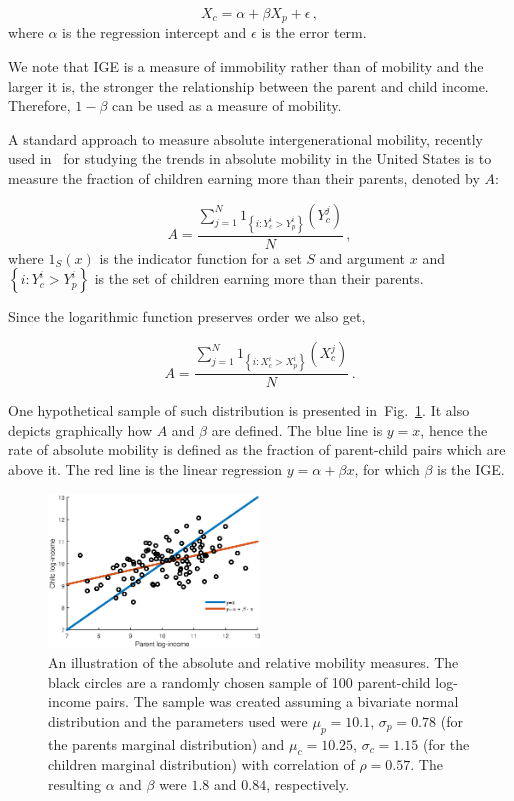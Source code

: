 \documentclass[prl,amsmath,twocolumn,nofootinbib]{revtex4}
\newcommand{\flabel}[1]{\label{fig:#1}}
\newcommand{\fref}[1]{Fig.~\ref{fig:#1}}
\newcommand{\be}{\begin{equation}}
\newcommand{\ee}{\end{equation}}
\numberwithin{equation}{section}
\begin{document}
\be
X_c = \alpha + \beta X_p + \epsilon\,,
\ee
where $\alpha$ is the regression intercept and $\epsilon$ is the error term.

We note that IGE is a measure of immobility rather than of mobility and the larger it is, the stronger the relationship between the parent and child income. Therefore, $1-\beta$  can be used as a measure of mobility.

A standard approach to measure absolute intergenerational mobility, recently used in~\cite{chetty2017fading} for studying the trends in absolute mobility in the United States is to measure the fraction of children earning more than their parents, denoted by $A$:

\be
A = \frac{\sum_{j=1}^{N}{1_{\left\{i:Y_c^i>Y_p^i\right\}}\left(Y_c^j\right)}}{N}\,,
\ee
where $1_S\left(x\right)$ is the indicator function for a set $S$ and argument $x$ and $\left\{i:Y_c^i>Y_p^i\right\}$ is the set of children earning more than their parents.

Since the logarithmic function preserves order we also get,

\be
A = \frac{\sum_{j=1}^{N}{1_{\left\{i:X_c^i>X_p^i\right\}}\left(X_c^j\right)}}{N}\,.
\ee

One hypothetical sample of such distribution is presented in~\fref{lines}. It also depicts graphically how $A$ and $\beta$ are defined. The blue line is $y=x$, hence the rate of  absolute mobility is defined as the fraction of parent-child pairs which are above it. The red line is the linear regression $y=\alpha +\beta x$, for which $\beta$ is the IGE.

\begin{figure}[!htb]
\centering
\includegraphics[width=0.5\textwidth]{./bivariate_lines3.eps}
\caption{An illustration of the absolute and relative mobility measures. The black circles are a randomly chosen sample of 100 parent-child log-income pairs. The sample was created assuming a bivariate normal distribution and the parameters used were $\mu_p=10.1$, $\sigma_p=0.78$ (for the parents marginal distribution) and $\mu_c=10.25$, $\sigma_c=1.15$ (for the children marginal distribution) with correlation of $\rho=0.57$. The resulting $\alpha$ and $\beta$ were $1.8$ and $0.84$, respectively.}
\flabel{lines}
\end{figure}
\end{document}
